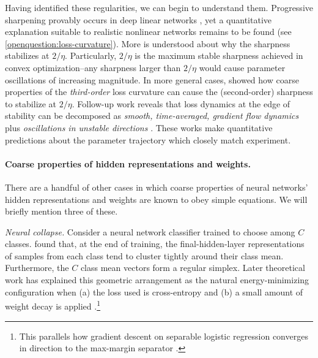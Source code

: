 Having identified these regularities, we can begin to understand them.
Progressive sharpening provably occurs in deep linear networks \citep{even2023s,yoo2025understanding}, yet a quantitative explanation suitable to realistic nonlinear networks remains to be found (see \cref{openquestion:loss-curvature}).
More is understood about why the sharpness stabilizes at $2 / \eta$.
Particularly, $2 / \eta$ is the maximum stable sharpness achieved in convex optimization--any sharpness larger than $2/\eta$ would cause parameter oscillations of increasing magnitude.
In more general cases, \citet{damian2022self} showed how coarse properties of the \textit{third-order} loss curvature can cause the (second-order) sharpness to stabilize at $2 / \eta$.
Follow-up work reveals that loss dynamics at the edge of stability can be decomposed as \textit{smooth, time-averaged, gradient flow dynamics} plus \textit{oscillations in unstable directions} \citep{centralflows}.
These works make quantitative predictions about the parameter trajectory which closely match experiment.


\paragraph{Coarse properties of hidden representations and weights.}

There are a handful of other cases in which coarse properties of neural networks' hidden representations and weights are known to obey simple equations.
We will briefly mention three of these.

\textit{Neural collapse.}
Consider a neural network classifier trained to choose among $C$ classes.
\citet{neuralCollapse} found that, at the end of training, the final-hidden-layer representations of samples from each class tend to cluster tightly around their class mean.
Furthermore, the $C$ class mean vectors form a regular simplex.
Later theoretical work has explained this geometric arrangement as the natural energy-minimizing configuration when (a) the loss used is cross-entropy and (b) a small amount of weight decay is applied \citep{zhu2021geometric}.\footnote{This parallels how gradient descent on separable logistic regression converges in direction to the max-margin separator \citep{soudry:2018-implicit-bias-of-gd}.}


